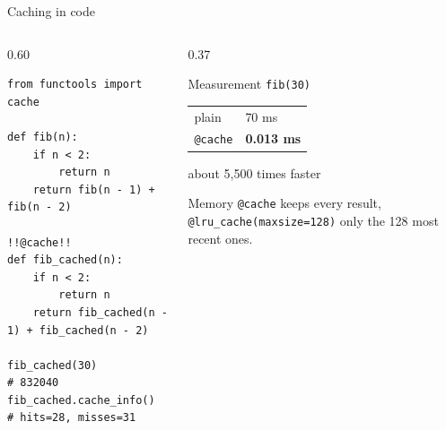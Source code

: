 \documentclass[aspectratio=169,11pt]{beamer}
\begin{document}
\begin{frame}[fragile]{Caching in code}
  \begin{columns}[T,onlytextwidth]
  \begin{column}{0.60\textwidth}
\begin{lstlisting}
from functools import cache

def fib(n):
    if n < 2:
        return n
    return fib(n - 1) + fib(n - 2)

!!@cache!!
def fib_cached(n):
    if n < 2:
        return n
    return fib_cached(n - 1) + fib_cached(n - 2)

fib_cached(30)            # 832040
fib_cached.cache_info()   # hits=28, misses=31
\end{lstlisting}
  \end{column}
  \begin{column}{0.37\textwidth}
    \begin{block}{Measurement}
      \texttt{fib(30)}\par\smallskip
      \begin{tabular}{@{}ll@{}}
        plain & 70 ms\\
        \texttt{@cache} & \textbf{0.013 ms}\\
      \end{tabular}\par\smallskip
      about 5,500 times faster
    \end{block}
    \begin{block}{Memory}
      \texttt{@cache} keeps every result, \texttt{@lru\_cache(maxsize=128)} only the 128 most
      recent ones.
    \end{block}
  \end{column}
  \end{columns}
\end{frame}
\end{document}
